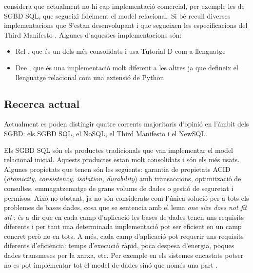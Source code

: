 \textcite[cap.~2]{date06} %
considera que actualment no hi cap implementació comercial, per
exemple les de \gls{SGBD} \gls{SQL}, que segueixi fidelment el model relacional.
Si bé recull diverses implementacions que
S'estan desenvolupant i que segueixen les
especificacions del Third
Manifesto \parencite[Projects]{date:thethirdmanifesto.com}.  Algunes
d'aquestes implementacions són:
\begin{itemize}
\item Rel \parencite{rel}, que és un dels més consolidats i usa
  Tutorial D com a llenguatge
\item Dee \parencite{dee}, que és una implementació molt diferent a
  les altres ja que defineix el llenguatge relacional com una extensió
  de Python

\end{itemize}










\subsection{Recerca actual}

Actualment es poden distingir quatre corrents majoritaris d'opinió en
l'àmbit dels \gls{SGBD}: els \gls{SGBD} \gls{SQL}, el NoSQL, el Third Manifesto i el
NewSQL.

Els \gls{SGBD} \gls{SQL} són els productes tradicionals que van implementar el
model relacional inicial. Aquests productes estan molt consolidats i
són els més usats. Algunes propietats que tenen són les següents:
garantia de propietats ACID (\emph{atomicity, consistency, isolation,
  durability}) amb transaccions, optimització de consultes,
emmagatzematge de grans volums de dades o gestió de seguretat i
permisos.  Això no obstant, ja no són considerats com l'única solució
per a tots els problemes de bases dades, cosa que se sentencia amb el
lema \emph{one size does not fit
  all} \parencite{stonebraker07,stonebraker09}; és a dir que en cada
camp d'aplicació les bases de dades tenen uns requisits diferents i
per tant una determinada implementació pot ser eficient en un camp
concret però no en tots. A més, cada camp d'aplicació pot requerir uns
requisits diferents d'eficiència: temps d'execució ràpid, poca despesa
d'energia, poques dades transmeses per la xarxa, etc. Per exemple en
els sistemes encastats potser no es pot implementar tot el model de
dades sinó que només una
part \parencite{saake09:_downs_data_manag_embed_system}.



